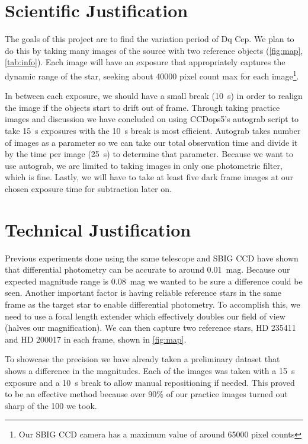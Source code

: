 \documentclass[]{article}
\begin{document}
\section{Scientific Justification}
	The goals of this project are to find the variation period of Dq Cep. We plan to do this by taking many images of the source with two reference objects (\autoref{fig:map}, \autoref{tab:info}). Each image will have an exposure that appropriately captures the dynamic range of the star, seeking about \num{40000} pixel count max for each image\footnote{Our SBIG CCD camera has a maximum value of around \num{65000} pixel counts}.

	In between each exposure, we should have a small break (\SI{10}{\second}) in order to realign the image if the objects start to drift out of frame. Through taking practice images and discussion we have concluded on using CCDops5's autograb script to take \SI{15}{\second} exposures with the \SI{10}{\second} break is most efficient. Autograb takes number of images as a parameter so we can take our total observation time and divide it by the time per image (\SI{25}{\second}) to determine that parameter. Because we want to use autograb, we are limited to taking images in only one photometric filter, which is fine. Lastly, we will have to take at least five dark frame images at our chosen exposure time for subtraction later on.


\section{Technical Justification}

	Previous experiments done using the same telescope and SBIG CCD have shown that differential photometry can be accurate to around \SI{0.01}{mag}. Because our expected magnitude range is \SI{0.08}{mag} we wanted to be sure a difference could be seen. Another important factor is having reliable reference stars in the same frame as the target star to enable differential photometry. To accomplish this, we need to use a focal length extender which effectively doubles our field of view (halves our magnification). We can then capture two reference stars, HD 235411 and HD 200017 in each frame, shown in \autoref{fig:map}.
	
	To showcase the precision we have already taken a preliminary dataset that shows a difference in the magnitudes. Each of the images was taken with a \SI{15}{\second} exposure and a \SI{10}{\second} break to allow manual repositioning if needed. This proved to be an effective method because over 90\% of our practice images turned out sharp of the 100 we took.
	
\end{document}
